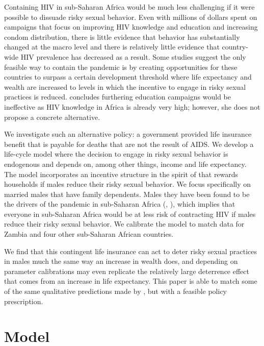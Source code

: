 \documentclass[12pt]{article}
\newcommand{\citee}[1]{\citet*{#1}}
\begin{document}
Containing HIV in sub-Saharan Africa would be much less challenging if it were possible to dissuade risky sexual behavior. Even with millions of dollars spent on campaigns that focus on improving HIV knowledge and education and increasing condom distribution, there is little evidence that behavior has substantially changed at the macro level and there is relatively little evidence that country-wide HIV prevalence has decreased as a result.  Some studies suggest the only feasible way to contain the pandemic is by creating opportunities for these countries to surpass a certain development threshold where life expectancy and wealth are increased to levels in which the incentive to engage in risky sexual practices is reduced.  \citee{eo2009} concludes furthering education campaigns would be ineffective as HIV knowledge in Africa is already very high; however, she does not propose a concrete alternative.

We investigate such an alternative policy: a government provided life insurance benefit that is payable for deaths that are not the result of AIDS.  We develop a life-cycle model where the decision to engage in risky sexual behavior is endogenous and depends on, among other things, income and life expectancy.  The model incorporates an incentive structure in the spirit of \citee{HO2010} that rewards households if males reduce their risky sexual behavior.  We focus specifically on married males that have family dependents.  Males they have been found to be the drivers of the pandemic in sub-Saharan Africa (\citee{Ulin1992}, \citee{HE2007}), which implies that everyone in sub-Saharan Africa would be at less risk of contracting HIV if males reduce their risky sexual behavior.  We calibrate the model to match data for Zambia and four other sub-Saharan African countries.

We find that this contingent life insurance can act to deter risky sexual practices in males much the same way an increase in wealth does, and depending on parameter calibrations may even replicate the relatively large deterrence effect that comes from an increase in life expectancy.  This paper is able to match some of the same qualitative predictions made by \citee{eoQJE}, but with a feasible policy prescription.

\section{Model}\label{s:model}
\end{document}
